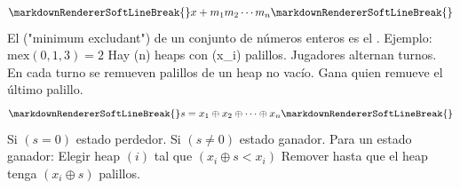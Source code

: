 {}\markdownRendererParagraphSeparator
{}$$\markdownRendererSoftLineBreak
{}x + m_1 m_2 \cdots m_n\markdownRendererSoftLineBreak
{}$$\markdownRendererInterblockSeparator
{}\markdownRendererInterblockSeparator
{}
\markdownRendererSectionEnd 
\markdownRendererSectionEnd \markdownRendererSectionBegin
{}\markdownRendererInterblockSeparator
{}El  ("minimum excludant") de un conjunto de números enteros es el .\markdownRendererParagraphSeparator
{}Ejemplo: $\mathrm{mex}({0,1,3}) = 2$\markdownRendererInterblockSeparator
{}\markdownRendererInterblockSeparator
{}
\markdownRendererSectionEnd 
\markdownRendererSectionEnd \markdownRendererSectionBegin
{}\markdownRendererInterblockSeparator
{}\markdownRendererUlBeginTight
\markdownRendererUlItem Hay (n) heaps con (x_i) palillos.\markdownRendererUlItemEnd 
\markdownRendererUlItem Jugadores alternan turnos.\markdownRendererUlItemEnd 
\markdownRendererUlItem En cada turno se remueven palillos de un heap no vacío.\markdownRendererUlItemEnd 
\markdownRendererUlItem Gana quien remueve el último palillo.\markdownRendererUlItemEnd 
\markdownRendererUlEndTight \markdownRendererInterblockSeparator
{}\markdownRendererSectionBegin
{}\markdownRendererInterblockSeparator
{}$$\markdownRendererSoftLineBreak
{}s = x_1 \oplus x_2 \oplus \dots \oplus x_n\markdownRendererSoftLineBreak
{}$$\markdownRendererInterblockSeparator
{}\markdownRendererUlBeginTight
\markdownRendererUlItem Si $(s = 0)$ estado perdedor.\markdownRendererUlItemEnd 
\markdownRendererUlItem Si $(s \neq 0)$ estado ganador.\markdownRendererUlItemEnd 
\markdownRendererUlEndTight \markdownRendererInterblockSeparator
{}
\markdownRendererSectionEnd \markdownRendererSectionBegin
{}\markdownRendererInterblockSeparator
{}Para un estado ganador:\markdownRendererInterblockSeparator
{}\markdownRendererUlBeginTight
\markdownRendererUlItem Elegir heap $(i)$ tal que $(x_i \oplus s < x_i)$\markdownRendererUlItemEnd 
\markdownRendererUlItem Remover hasta que el heap tenga $(x_i \oplus s)$ palillos.\markdownRendererUlItemEnd 
\markdownRendererUlEndTight \markdownRendererParagraphSeparator
